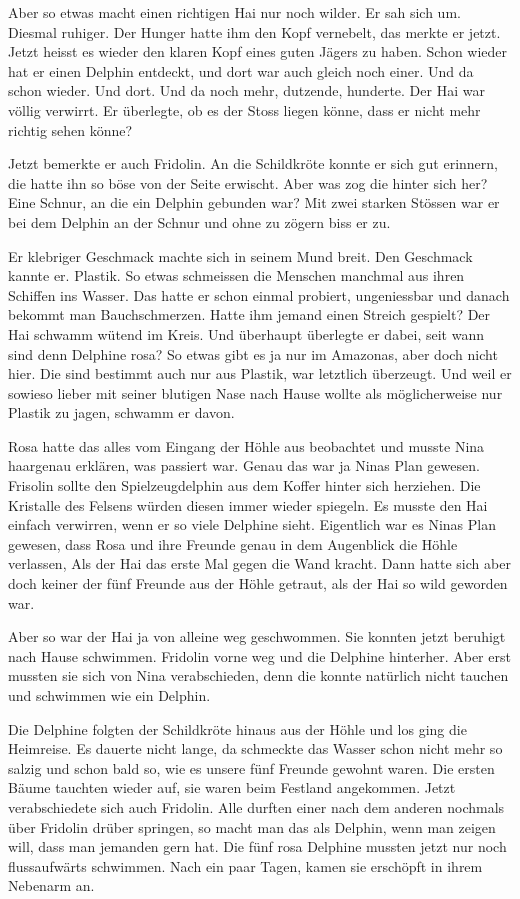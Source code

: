 Aber so etwas macht einen richtigen Hai nur noch wilder. Er sah sich um. Diesmal ruhiger. Der Hunger hatte ihm den Kopf vernebelt, das merkte er jetzt. Jetzt heisst es wieder den klaren Kopf eines guten Jägers zu haben. Schon wieder hat er einen Delphin entdeckt, und dort war auch gleich noch einer. Und da schon wieder. Und dort. Und da noch mehr, dutzende, hunderte. Der Hai war völlig verwirrt. Er überlegte, ob es der Stoss liegen könne, dass er nicht mehr richtig sehen könne?

Jetzt bemerkte er auch Fridolin. An die Schildkröte konnte er sich gut erinnern, die hatte ihn so böse von der Seite erwischt. Aber was zog die hinter sich her? Eine Schnur, an die ein Delphin gebunden war? Mit zwei starken Stössen war er bei dem Delphin an der Schnur und ohne zu zögern biss er zu.

Er klebriger Geschmack machte sich in seinem Mund breit. Den Geschmack kannte er. Plastik. So etwas schmeissen die Menschen manchmal aus ihren Schiffen ins Wasser. Das hatte er schon einmal probiert, ungeniessbar und danach bekommt man Bauchschmerzen. Hatte ihm jemand einen Streich gespielt? Der Hai schwamm wütend im Kreis. Und überhaupt überlegte er dabei, seit wann sind denn Delphine rosa? So etwas gibt es ja nur im Amazonas, aber doch nicht hier. Die sind bestimmt auch nur aus Plastik, war letztlich überzeugt.  Und weil er sowieso lieber mit seiner blutigen Nase nach Hause wollte als möglicherweise nur Plastik zu jagen, schwamm er davon.

Rosa hatte das alles vom Eingang der Höhle aus beobachtet und musste Nina haargenau erklären, was passiert war. Genau das war ja Ninas Plan gewesen. Frisolin sollte den Spielzeugdelphin aus dem Koffer hinter sich herziehen. Die Kristalle des Felsens würden diesen immer wieder spiegeln. Es musste den Hai einfach verwirren, wenn er so viele Delphine sieht. Eigentlich war es Ninas Plan gewesen, dass Rosa und ihre Freunde genau in dem Augenblick die Höhle verlassen, Als der Hai das erste Mal gegen die Wand kracht. Dann hatte sich aber doch keiner der fünf Freunde aus der Höhle getraut, als der Hai so wild geworden war.

Aber so war der Hai ja von alleine weg geschwommen. Sie konnten jetzt beruhigt nach Hause schwimmen. Fridolin vorne weg und die Delphine hinterher. Aber erst mussten sie sich von Nina verabschieden, denn die konnte natürlich nicht tauchen und schwimmen wie ein Delphin. 

Die Delphine folgten der Schildkröte hinaus aus der Höhle und los ging die Heimreise. Es dauerte nicht lange, da schmeckte das Wasser schon nicht mehr so salzig und schon bald so, wie es unsere fünf Freunde gewohnt waren. Die ersten Bäume tauchten wieder auf, sie waren beim Festland angekommen. Jetzt verabschiedete sich auch Fridolin. Alle durften einer nach dem anderen nochmals über Fridolin drüber springen, so macht man das als Delphin, wenn man zeigen will, dass man jemanden gern hat. Die fünf rosa Delphine mussten jetzt nur noch flussaufwärts schwimmen. Nach ein paar Tagen, kamen sie erschöpft in ihrem Nebenarm an.

